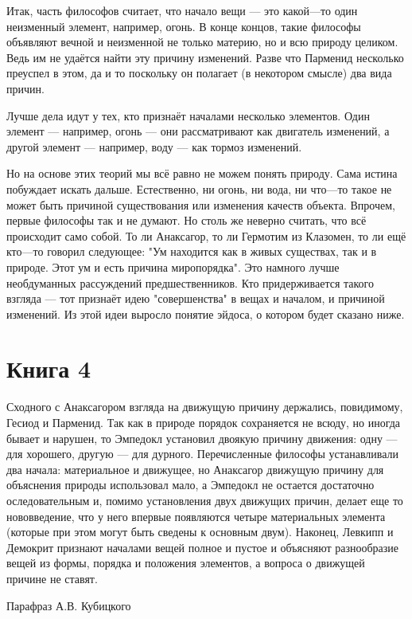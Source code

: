 \documentclass[oneside, 17pt, dvipsnames]{extbook}
\begin{document}
Итак, часть философов считает, что начало вещи --- это какой---то один неизменный элемент, например, огонь. В конце концов, такие философы объявляют вечной и неизменной не только материю, но и всю природу целиком. Ведь им не удаётся найти эту причину изменений. Разве что Парменид несколько преуспел в этом, да и то поскольку он полагает (в некотором смысле) два вида причин.

Лучше дела идут у тех, кто признаёт началами несколько элементов. Один элемент --- например, огонь --- они рассматривают как двигатель изменений, а другой элемент --- например, воду --- как тормоз изменений.

Но на основе этих теорий мы всё равно не можем понять природу. Сама истина побуждает искать дальше. Естественно, ни огонь, ни вода, ни что---то такое не может быть причиной существования или изменения качеств объекта. Впрочем, первые философы так и не думают. Но столь же неверно считать, что всё происходит само собой. То ли Анаксагор, то ли Гермотим из Клазомен, то ли ещё кто---то говорил следующее: "Ум находится как в живых существах, так и в природе. Этот ум и есть причина миропорядка". Это намного лучше необдуманных рассуждений предшественников. Кто придерживается такого взгляда --- тот признаёт идею "совершенства" в вещах и началом, и причиной изменений. Из этой идеи выросло понятие эйдоса, о котором будет сказано ниже.





\newpage
\section{Книга 4}

\epigraph{
Сходного с Анаксагором взгляда на движущую причину держались, повидимому, Гесиод и Парменид. Так как в природе порядок сохраняется не всюду, но иногда бывает и нарушен, то Эмпедокл установил двоякую причину движения: одну --- для хорошего, другую --- для дурного. Перечисленные философы устанавливали два начала: материальное и движущее, но Анаксагор движущую причину для объяснения природы использовал мало, а Эмпедокл не остается достаточно оследовательным и, помимо установления двух движущих причин, делает еще то нововведение, что у него впервые появляются четыре материальных элемента (которые при этом могут быть сведены к основным двум). Наконец, Левкипп и Демокрит признают началами вещей полное и пустое и объясняют разнообразие вещей из формы, порядка и положения элементов, а вопроса о движущей причине не ставят.
}{Парафраз А.В. Кубицкого}
\end{document}
